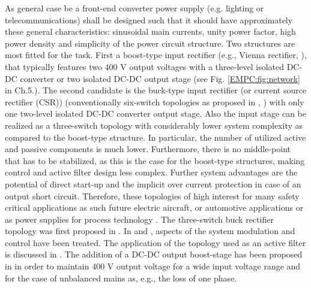 As  general case be a front-end  converter power supply (e.g. lighting or telecommunications) shall be designed such that it should have approximately these general characteristics: sinusoidal main currents, unity power factor, high power density and simplicity of the power circuit structure. Two structures are most fitted for the task. First a boost-type input rectifier (e.g., Vienna rectifier, \cite{kolar1996design}), that typically features two $400$ V output voltages with a three-level isolated  DC-DC  converter  or  two  isolated  DC-DC  output  stage (see Fig. \ref{EMPC:fig:network} in Ch.5.). The second candidate is the buck-type  input  rectifier (or current source rectifier (CSR))  (conventionally  six-switch topologies as proposed in \cite{zargari1993current}, \cite{sato1993state}) with only one two-level isolated  DC-DC  converter  output  stage.  Also the  input  stage  can be realized as a three-switch topology with considerably  lower  system  complexity  as  compared  to  the boost-type structure. In particular, the number of utilized active and passive components is much lower. Furthermore, there is no middle-point that has to be stabilized, as this is the case for the boost-type structures, making control and active filter design less complex. Further system advantages are the potential of direct start-up and the implicit over current protection in case of an output short circuit. Therefore, these topologies of high interest for many safety critical applications as such future electric aircraft, or automotive applications or as power supplies for process technology \cite{nussbaumer2007comprehensive}.
The three-switch buck rectifier topology was first proposed in \cite{malesani1987three}. In \cite{itoh1989steady} and \cite{tooth2000effects}, aspects of the system modulation and control have been treated. The application of the topology used as an active filter is discussed in \cite{salo2005three}.  The addition of a DC-DC output boost-stage has been proposed in \cite{baumannnew} in order to maintain 400 V output voltage for a wide input voltage range and for the case of unbalanced mains as, e.g., the loss of one phase.

\label{BASICCSR:sec:OperationPrinciple}

